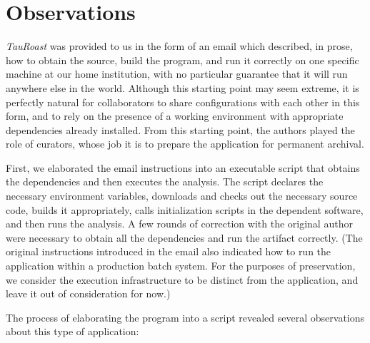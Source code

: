 \documentclass{sig-alternate}
\begin{document}
\section{Observations}

\emph{TauRoast} was provided to us in the form of an
email which described, in prose, how to obtain the source,
build the program, and run it correctly on one specific
machine at our home institution, with no particular guarantee that
it will run anywhere else in the world.
Although this starting point may seem extreme, it is
perfectly natural for collaborators to share configurations
with each other in this form, and to rely on the presence
of a working environment with appropriate dependencies already
installed.  From this starting point, the authors played the
role of curators, whose job it is to prepare the application
for permanent archival.

First, we elaborated the email instructions into an
executable script that obtains the dependencies and then
executes the analysis.  The script declares the necessary
environment variables, downloads and checks out the necessary source code,
builds it appropriately, calls initialization scripts in
the dependent software, and then runs the analysis.
A few rounds of correction with the original author were necessary
to obtain all the dependencies and run the artifact correctly.
(The original instructions introduced in the email also indicated how to run the application
within a production batch system.  For the purposes of preservation,
we consider the execution infrastructure to be distinct from the application,
and leave it out of consideration for now.)

The process of elaborating the program into a script revealed
several observations about this type of application:
\end{document}

